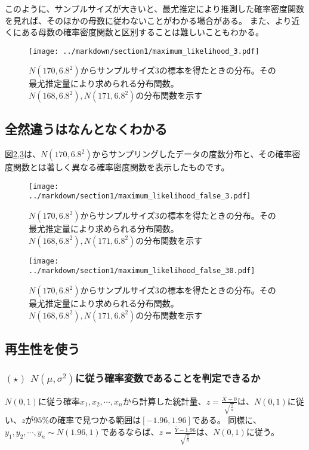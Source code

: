 \documentclass[a4paper,11pt,dvipdfmx]{jsarticle}
\begin{document}
このように、サンプルサイズが大きいと、最尤推定により推測した確率密度関数を見れば、そのほかの母数に従わないことがわかる場合がある。
また、より近くにある母数の確率密度関数と区別することは難しいこともわかる。

\begin{figure}
    \begin{center}
        \texttt{[image: ../markdown/section1/maximum\_likelihood\_3.pdf]}
        \caption{$N(170,6.8^2)$からサンプルサイズ$3$の標本を得たときの分布。その最尤推定量により求められる分布関数。$N(168,6.8^2),N(171,6.8^2)$の分布関数を示す}
        \label{fig:maximum_likelihood_0}
    \end{center}
\end{figure}

\subsection{全然違うはなんとなくわかる}
図\ref{fig:maximum_likelihood_false_3},\ref{fig:maximum_likelihood_false_30}は、$N(170,6.8^2)$からサンプリングしたデータの度数分布と、その確率密度関数とは著しく異なる確率密度関数を表示したものです。

\begin{figure}
    \begin{center}
        \texttt{[image: ../markdown/section1/maximum\_likelihood\_false\_3.pdf]}
        \caption{$N(170,6.8^2)$からサンプルサイズ$3$の標本を得たときの分布。その最尤推定量により求められる分布関数。$N(168,6.8^2),N(171,6.8^2)$の分布関数を示す}
        \label{fig:maximum_likelihood_false_3}
    \end{center}
\end{figure}

\begin{figure}
    \begin{center}
        \texttt{[image: ../markdown/section1/maximum\_likelihood\_false\_30.pdf]}
        \caption{$N(170,6.8^2)$からサンプルサイズ$3$の標本を得たときの分布。その最尤推定量により求められる分布関数。$N(168,6.8^2),N(171,6.8^2)$の分布関数を示す}
        \label{fig:maximum_likelihood_false_30}
    \end{center}
\end{figure}

\clearpage
\subsection{再生性を使う}
\subsubsection{$(\star)$ $N(\mu,\sigma^2)$に従う確率変数であることを判定できるか}
$N(0,1)$に従う確率$x_1,x_2,\cdots,x_n$から計算した統計量、$z=\frac{\bar{X}-0}{\sqrt{\frac{1}{n}}}$は、$N(0,1)$に従い、$z$が$95\%$の確率で見つかる範囲は$[-1.96,1.96]$である。
同様に、$y_1,y_2,\cdots,y_n \sim N(1.96,1)$であるならば、$z=\frac{\bar{Y}-1.96}{\sqrt{\frac{1}{n}}}$は、$N(0,1)$に従う。
\end{document}
